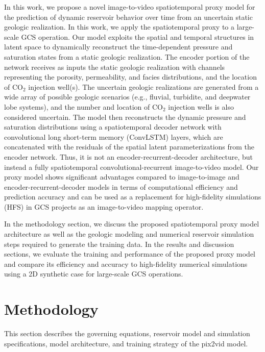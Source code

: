 \documentclass[default,iicol]{sn-jnl}
\begin{document}
In this work, we propose a novel image-to-video spatiotemporal proxy model for the prediction of dynamic reservoir behavior over time from an uncertain static geologic realization. In this work, we apply the spatiotemporal proxy to a large-scale GCS operation. Our model exploits the spatial and temporal structures in latent space to dynamically reconstruct the time-dependent pressure and saturation states from a static geologic realization. The encoder portion of the network receives as inputs the static geologic realization with channels representing the porosity, permeability, and facies distributions, and the location of CO$_2$ injection well(s). The uncertain geologic realizations are generated from a wide array of possible geologic scenarios (e.g., fluvial, turbidite, and deepwater lobe systems), and the number and location of CO$_2$ injection wells is also considered uncertain. The model then reconstructs the dynamic pressure and saturation distributions using a spatiotemporal decoder network with convolutional long short-term memory (ConvLSTM) layers, which are concatenated with the residuals of the spatial latent parameterizations from the encoder network. Thus, it is not an encoder-recurrent-decoder architecture, but instead a fully spatiotemporal convolutional-recurrent image-to-video model. Our proxy model shows significant advantages compared to image-to-image and encoder-recurrent-decoder models in terms of computational efficiency and prediction accuracy and can be used as a replacement for high-fidelity simulations (HFS) in GCS projects as an image-to-video mapping operator. 

In the methodology section, we discuss the proposed spatiotemporal proxy model architecture as well as the geologic modeling and numerical reservoir simulation steps required to generate the training data. In the results and discussion sections, we evaluate the training and performance of the proposed proxy model and compare its efficiency and accuracy to high-fidelity numerical simulations using a 2D synthetic case for large-scale GCS operations. 


\section{Methodology}\label{sec2_methodology}
This section describes the governing equations, reservoir model and simulation specifications, model architecture, and training strategy of the pix2vid model.
\end{document}
